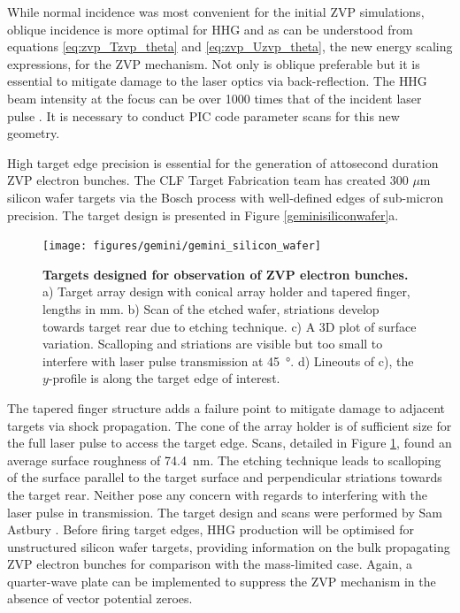 While normal incidence was most convenient for the initial ZVP simulations, oblique incidence is more optimal for \ac{HHG} \cite{gonoskovUltrarelativisticNanoplasmonicsRoute2011, edwardsXRayEmissionEffectiveness2020} and as can be understood from equations \ref{eq:zvp_Tzvp_theta} and \ref{eq:zvp_Uzvp_theta}, the new energy scaling expressions, for the ZVP mechanism. Not only is oblique preferable but it is essential to mitigate damage to the laser optics via back-reflection. The \ac{HHG} beam intensity at the focus can be over 1000 times that of the incident laser pulse \cite{quereReflectingPetawattLasers2021}. It is necessary to conduct PIC code parameter scans for this new geometry.

High target edge precision is essential for the generation of attosecond duration ZVP electron bunches. The CLF Target Fabrication team has created 300 $\mu$m silicon wafer targets via the Bosch process with well-defined edges of sub-micron precision. The target design is presented in Figure \ref{geminisiliconwafer}a.
\begin{figure}
	\centering
	\texttt{[image: figures/gemini/gemini\_silicon\_wafer]}
	\caption[Attosecond ZVP electron bunch targets]{\textbf{Targets designed for observation of ZVP electron bunches.} a) Target array design with conical array holder and tapered finger, lengths in mm. b) Scan of the etched wafer, striations develop towards target rear due to etching technique. c) A 3D plot of surface variation. Scalloping and striations are visible but too small to interfere with laser pulse transmission at \qty{45}{\degree}. d) Lineouts of c), the $y$-profile is along the target edge of interest.}
	\label{fig:geminisiliconwafer}
\end{figure}
The tapered finger structure adds a failure point to mitigate damage to adjacent targets via shock propagation. The cone of the array holder is of sufficient size for the full laser pulse to access the target edge. Scans, detailed in Figure \ref{fig:geminisiliconwafer}, found an average surface roughness of \qty{74.4}{nm}. The etching technique leads to scalloping of the surface parallel to the target surface and perpendicular striations towards the target rear. Neither pose any concern with regards to interfering with the laser pulse in transmission. The target design and scans were performed by Sam Astbury \cite{astburyTargetFabricationGroup2024}. Before firing target edges, HHG production will be optimised for unstructured silicon wafer targets, providing information on the bulk propagating ZVP electron bunches for comparison with the mass-limited case. Again, a quarter-wave plate can be implemented to suppress the ZVP mechanism in the absence of vector potential zeroes.

